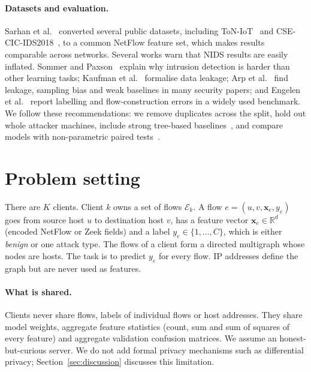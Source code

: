 \documentclass[pdflatex,sn-mathphys-num]{sn-jnl}
\begin{document}
\paragraph{Datasets and evaluation.} Sarhan et al.~\cite{sarhan2022standard} converted several public datasets, including ToN-IoT~\cite{moustafa2021toniot} and CSE-CIC-IDS2018~\cite{sharafaldin2018cicids}, to a common NetFlow feature set, which makes results comparable across networks. Several works warn that NIDS results are easily inflated. Sommer and Paxson~\cite{sommer2010closedworld} explain why intrusion detection is harder than other learning tasks; Kaufman et al.~\cite{kaufman2012leakage} formalise data leakage; Arp et al.~\cite{arp2022dos} find leakage, sampling bias and weak baselines in many security papers; and Engelen et al.~\cite{engelen2021troubleshooting} report labelling and flow-construction errors in a widely used benchmark. We follow these recommendations: we remove duplicates across the split, hold out whole attacker machines, include strong tree-based baselines~\cite{breiman2001rf,chen2016xgboost}, and compare models with non-parametric paired tests~\cite{demsar2006statistical}.

\section{Problem setting}\label{sec:problem}

There are $K$ clients. Client $k$ owns a set of flows $\mathcal{E}_k$. A flow $e=(u,v,\mathbf{x}_e,y_e)$ goes from source host $u$ to destination host $v$, has a feature vector $\mathbf{x}_e\in\mathbb{R}^d$ (encoded NetFlow or Zeek fields) and a label $y_e\in\{1,\dots,C\}$, which is either \emph{benign} or one attack type. The flows of a client form a directed multigraph whose nodes are hosts. The task is to predict $y_e$ for every flow. IP addresses define the graph but are never used as features.

\paragraph{What is shared.} Clients never share flows, labels of individual flows or host addresses. They share model weights, aggregate feature statistics (count, sum and sum of squares of every feature) and aggregate validation confusion matrices. We assume an honest-but-curious server. We do not add formal privacy mechanisms such as differential privacy; Section~\ref{sec:discussion} discusses this limitation.
\end{document}
